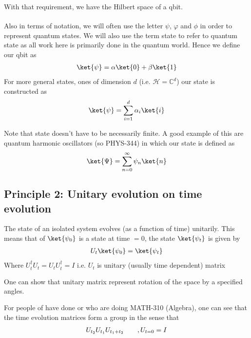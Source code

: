 	With that requirement, we have the Hilbert space of a qbit.\\
	$ $\\
	Also in terms of notation, we will often use the letter $\psi$, $\varphi$ and $ \phi$ in order to represent quantum states. We will also use the term state to refer to quantum state as all work here is primarily done in the quantum world. Hence we define our qbit as 
	\begin{align*} 
		\ket{\psi} = \alpha \ket{0} + \beta \ket{1} 
	\end{align*}
	For more general states, ones of dimension $d$ (i.e. $\mathcal{H} = \mathbb{C}^{d}$) our state is constructed as 
	\begin{align*} 
		\ket{\psi} = \sum_{i= 1}^{d} \alpha_i \ket{i}
	\end{align*}
	\begin{framedremark}
	    Note that state doesn't have to be necessarily finite. A good example of this are quantum harmonic oscillators (so PHYS-344) in which our state is defined as 
		\begin{align*} 
			 \ket{\Psi} = \sum_{n= 0}^{\infty} \psi_n \ket{n}
		\end{align*}
	\end{framedremark}



\subsection{Principle 2: Unitary evolution on time evolution}
The state of an isolated system evolves (as a function of time) unitarily. This means that of $\ket{\psi_0}$ is a state at time $= 0$, the state $\ket{\psi_t}$ is given by 
\begin{align*} 
	U_t \ket{\psi_0}  = \ket{\psi_t}
\end{align*}
Where $U_t^{\dagger}U_t = U_tU_t^{\dagger} = I$ i.e. $U_t$ is unitary (usually time dependent) matrix
\begin{framedremark}
One can show that unitary matrix represent rotation of the space by a specified angles.
\end{framedremark}

\begin{framedremark}
	For people of have done or who are doing MATH-310 (Algebra), one can see that the time evolution matrices form a group in the sense that 
	\begin{align*} 
		U_{t_2}U_{t_1} U_{t_1 + t_2} \quad \quad , U_{t= 0} = I
	\end{align*}
\end{framedremark}


